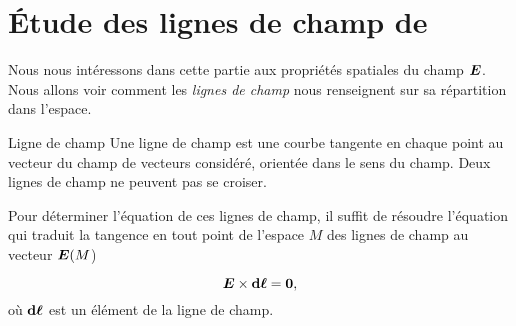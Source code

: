 \section{Étude des lignes de champ de \vece}
Nous nous intéressons dans cette partie aux propriétés spatiales du champ $\vece$.
Nous allons voir comment les \emph{lignes de champ} nous renseignent sur sa répartition 
dans l'espace.

\begin{defn}{Ligne de champ}
	Une ligne de champ est une courbe tangente en chaque point au vecteur 
	du champ de vecteurs considéré, orientée dans le sens du champ. Deux
	lignes de champ ne peuvent pas se croiser.
\end{defn}

Pour déterminer l'équation de ces lignes de champ, il suffit de résoudre l'équation
qui traduit la tangence en tout point de l'espace $M$ des lignes de champ 
au vecteur $\vece(M$)

\begin{equation}
	\vece \times \dl = \mitbf{0},
\end{equation}
où $\dl$ est un élément de la ligne de champ.



